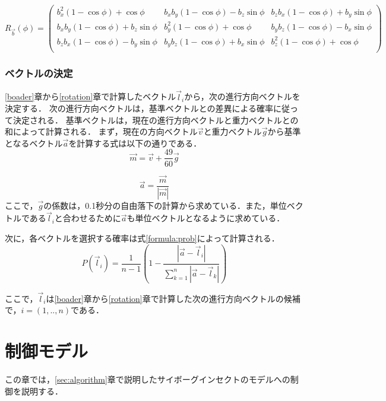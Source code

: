 \documentclass[a4paper,11pt]{jarticle}
\begin{document}
	\begin{equation}
	\label{formula:rotation}
	R_{\vec{b}}(\phi)=\left( \begin{array}{ccc}
	b_x^2(1-\cos\phi)+\cos\phi & b_x b_y (1-\cos\phi) - b_z\sin\phi & b_z b_x (1-\cos\phi) + b_y\sin\phi \\
	b_x b_y (1-\cos\phi)+b_z \sin\phi & b_y^2 (1-\cos\phi) + \cos\phi & b_y b_z (1-\cos\phi) - b_x\sin\phi \\
	b_z b_x (1-\cos\phi)- b_y\sin\phi & b_y b_z (1-\cos\phi) + b_x \sin\phi & b_z^2 (1-\cos\phi) + \cos\phi \\
	\end{array} \right)
	\end{equation}
	
	\subsubsection{ベクトルの決定}
	\ref{boader}章から\ref{rotation}章で計算したベクトル$\vec{l}_i$から，次の進行方向ベクトルを決定する．
	次の進行方向ベクトルは，基準ベクトルとの差異による確率に従って決定される．
	基準ベクトルは，現在の進行方向ベクトルと重力ベクトルとの和によって計算される．
	まず，現在の方向ベクトル$ \vec{v} $と重力ベクトル$ \vec{g} $から基準となるベクトル$ \vec{a} $を計算する式は以下の通りである．
	\begin{equation}
	\vec{m} = \vec{v} +\frac{49}{60} \vec{g} 
	\end{equation}

	\begin{equation}
		\vec{a} = \frac{\vec{m}}{|\vec{m}|}
	\end{equation}
	ここで，$ \vec{g} $の係数は，0.1秒分の自由落下の計算から求めている．また，単位ベクトルである$\vec{l}_i$と合わせるために$\vec{a}$も単位ベクトルとなるように求めている．
	
	次に，各ベクトルを選択する確率は式\ref{formula:prob}によって計算される．
	\begin{equation}
	\label{formula:prob}
	P(\vec{l}_i) = \frac{1}{n-1}(1 - \frac{|\vec{a} - \vec{l}_i |}{\sum_{k=1}^{n}|\vec{a} - \vec{l}_k|})
	\end{equation}
	
	ここで，$ \vec{l}_i $は\ref{boader}章から\ref{rotation}章で計算した次の進行方向ベクトルの候補で，$ i = (1, .. ,n) $である．
	
	\section{制御モデル}
	\label{sec:control}
	この章では，\ref{sec:algorithm}章で説明したサイボーグインセクトのモデルへの制御を説明する．
	
\end{document}
